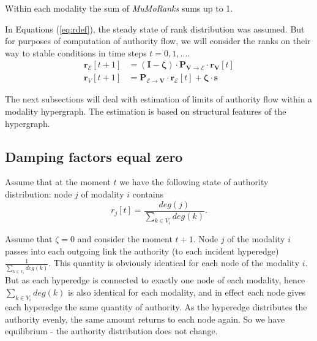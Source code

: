 \documentclass{fundam}
\newcommand{\HEM}{\mathcal{E}}
\newcommand{\N}{ V }
\newcommand{\Zeta}{\boldsymbol\zeta}
\begin{document}
\begin{example}
\begin{table}[ht!]
\begin{center}
\end{center}
\end{table}

Within each modality the sum of \emph{MuMoRanks} sums up to 1.
\end{example}%


In Equations (\ref{eq:rdef}), the steady state of rank distribution was assumed. But for purposes of computation of authority flow, we will consider the ranks on their way to stable conditions in time steps $t=0,1,\dots$.
\begin{equation} \label{eq:rdeftime}
\begin{split}
\mathbf{r}_{\HEM}[t+1] &=(\mathbf{I}-\Zeta){\cdot} \mathbf{P_{\N\rightarrow \HEM}}{\cdot}\mathbf{r_\N}[t] \\
\mathbf{r}_{\N}[t+1] &= \mathbf{P_{\HEM\rightarrow \N}}{\cdot}\mathbf{r_{\HEM}} [t]
+ \Zeta {\cdot} \mathbf{s}
\end{split}
\end{equation}

The next subsections will deal with estimation of limits of
authority flow within a modality hypergraph. The estimation is based on structural features of the hypergraph.

\subsection{Damping factors equal zero}

Assume  that at the moment $t$ we have the following state of authority distribution: node $j$ of modality $i$
contains $$r_{j}[t]=\frac{deg(j)}{\sum_{k\in \N_i} deg(k)}.$$

Assume that $\zeta=0$ and consider the moment $t{+}1$.
Node $j$ of the modality $i$ passes
into each outgoing link the authority (to each incident hyperedge)
$ \frac{1}{\sum_{k\in \N_i} deg(k)} $.
 This quantity is obviously identical for each node  of the modality $i$. But as each hyperedge is connected to exactly one node of each modality, hence $\sum_{k\in \N_i} deg(k)$ is also identical for each modality, and in effect each node gives each hyperedge the same quantity of authority. As the hyperedge distributes the authority evenly, the same amount returns to each node again. So we have equilibrium - the authority distribution does not change.
\end{document}
